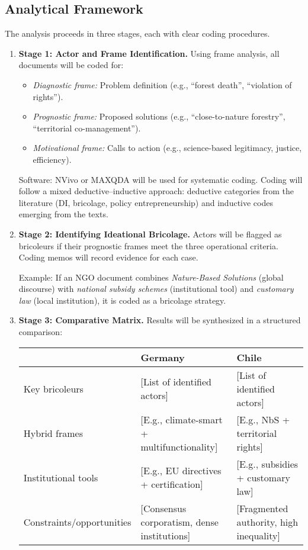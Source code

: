 \subsection*{Analytical Framework}
The analysis proceeds in three stages, each with clear coding procedures.

\begin{enumerate}
    \item \textbf{Stage 1: Actor and Frame Identification.}  
    Using frame analysis, all documents will be coded for:
    \begin{itemize}
        \item \textit{Diagnostic frame:} Problem definition (e.g., ``forest death'', 
        ``violation of rights'').
        \item \textit{Prognostic frame:} Proposed solutions (e.g., 
        ``close-to-nature forestry'', ``territorial co-management'').
        \item \textit{Motivational frame:} Calls to action (e.g., science-based 
        legitimacy, justice, efficiency).
    \end{itemize}
    Software: NVivo or MAXQDA will be used for systematic coding.  
    Coding will follow a mixed deductive–inductive approach: deductive categories 
    from the literature (DI, bricolage, policy entrepreneurship) and inductive 
    codes emerging from the texts.

    \item \textbf{Stage 2: Identifying Ideational Bricolage.}  
    Actors will be flagged as bricoleurs if their prognostic frames meet the three 
    operational criteria. Coding memos will record evidence for each case. 

    Example: If an NGO document combines \textit{Nature-Based Solutions} (global discourse) 
    with \textit{national subsidy schemes} (institutional tool) and \textit{customary law} 
    (local institution), it is coded as a bricolage strategy.

    \item \textbf{Stage 3: Comparative Matrix.}  
    Results will be synthesized in a structured comparison:

    \begin{center}
    \begin{tabular}{p{3cm}p{5cm}p{5cm}}
    \toprule
    & \textbf{Germany} & \textbf{Chile} \\
    \midrule
    Key bricoleurs & [List of identified actors] & [List of identified actors] \\
    Hybrid frames & [E.g., climate-smart + multifunctionality] & [E.g., NbS + territorial rights] \\
    Institutional tools & [E.g., EU directives + certification] & [E.g., subsidies + customary law] \\
    Constraints/opportunities & [Consensus corporatism, dense institutions] & [Fragmented authority, high inequality] \\
    \bottomrule
    \end{tabular}
    \end{center}
\end{enumerate}

